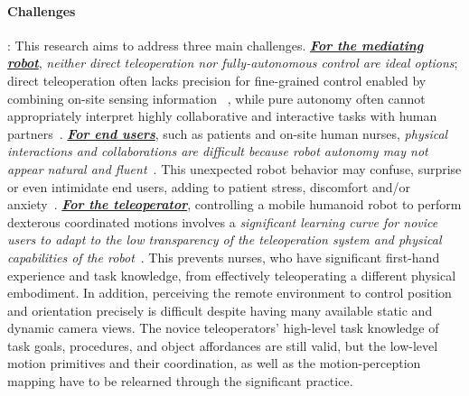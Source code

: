\documentclass[letterpaper, 11 pt, onecolumn]{article}
\newcommand{\fig}[1]{Fig.~\ref{#1}}
\begin{document}
\paragraph*{Challenges}: This research aims to address three main challenges. \underline{\textbf{\textit{For the mediating robot}}}, {\it neither direct teleoperation nor fully-autonomous control are ideal options}; direct teleoperation often lacks precision for fine-grained control enabled by combining on-site sensing information ~\cite{chen2007human,chen2011supervisory}, while pure autonomy often cannot appropriately interpret highly collaborative and interactive tasks with human partners~\cite{beer2014toward,nahavandi2017trusted,alaieri2016ethical}. \underline{\textbf{\textit{For end users}}}, such as patients and on-site human nurses, {\it physical interactions and collaborations are difficult because robot autonomy may not appear natural and fluent}~\cite{goetz2003matching,strabala2013towards, mitsunaga2008adapting}. This unexpected robot behavior may confuse, surprise or even intimidate end users, adding to patient stress, discomfort and/or anxiety~\cite{nomura2008prediction}. \underline{\textbf{\textit{For the teleoperator}}}, controlling a mobile humanoid robot to perform dexterous coordinated motions involves a {\it significant learning curve for novice users to adapt to the low transparency of the teleoperation system and physical capabilities of the robot}~\cite{rosen2002task,ballantyne2002robotic,novick2003analysis,sudan2012multifactorial,sng2013multiphasic}. This prevents nurses, who have significant first-hand experience and task knowledge, from effectively teleoperating a different physical embodiment.
In addition, perceiving the remote environment to control position and orientation precisely is difficult despite having many available static and dynamic camera views. The novice teleoperators' high-level task knowledge of task goals, procedures, and object affordances are still valid, but the low-level motion primitives and their coordination,  as well as the motion-perception mapping have to be relearned through the significant practice. 




\end{document}

